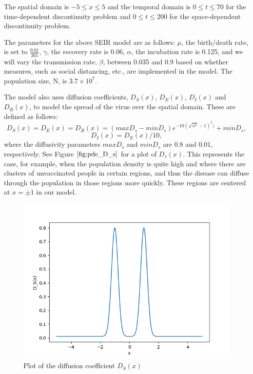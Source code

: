 The spatial domain is $-5 \leq x \leq 5$ and the temporal domain is $0 \leq t \leq 70$ for the time-dependent discontinuity problem and $0 \leq t \leq 200$ for the space-dependent discontinuity problem.

The parameters for the above SEIR model are as follows: $\mu$, the birth/death rate, is set to $\frac{0.01}{365}$, $\gamma$, the recovery rate is 0.06, $\alpha$, the incubation rate is 0.125, and we will vary the transmission rate, $\beta$, between 0.035 and 0.9 based on whether measures, such as social distancing, etc., are implemented in the model. The population size, N, is $3.7 \times 10^{7}$.

The model also uses diffusion coefficients,  $D_S(x)$, $D_E(x)$, $D_I(x)$ and $D_R(x)$, to model the spread of the virus over the spatial domain. These are defined as follows:
\begin{equation}
D_S(x) = D_E(x) = D_R(x) = (maxD_s - minD_s)e^{-10(\sqrt{x^{2}} - 1)^2)} + minD_s,
\end{equation} 
\begin{equation}
D_I(x) = D_E(x)/10,
\end{equation}
where the diffusivity parameters $maxD_s$ and $minD_s$ are 0.8 and 0.01, respectively. See Figure $\ref{fig:pde_D_s}$ for a plot of $D_s(x)$. This represents the case, for example, when the population density is quite high and where there are clusters of unvaccinated people in certain regions, and thus the disease can diffuse through the population in those regions more quickly. These regions are centered at $x= \pm 1$ in our model.

\begin{figure}[H]
\centering
\includegraphics[width=0.7\linewidth]{./figures/pde_D_s}
\caption{Plot of the diffusion coefficient $D_S(x)$}
\label{fig:pde_D_s}
\end{figure}


